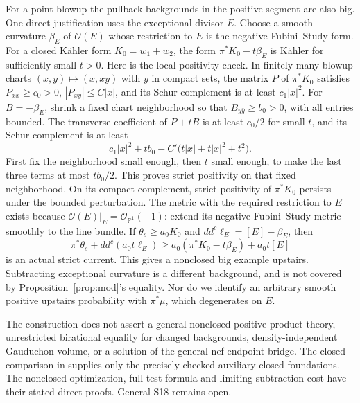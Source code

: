 \documentclass[11pt]{article}
\newcommand{\ddc}{dd^c}
\newcommand{\PP}{\mathbb P}
\begin{document}
For a point blowup the pullback backgrounds in the positive segment are
also big. One direct justification uses the exceptional divisor $E$.
Choose a smooth curvature $\beta_E$ of $\mathcal O(E)$ whose restriction
to $E$ is the negative Fubini--Study form. For a closed K\"ahler form
$K_0=w_1+w_2$, the form $\pi^*K_0-t\beta_E$ is K\"ahler for sufficiently
small $t>0$. Here is the local positivity check. In finitely many blowup
charts $(x,y)\mapsto(x,xy)$ with $y$ in compact sets, the matrix $P$ of
$\pi^*K_0$ satisfies $P_{x\bar x}\geq c_0>0$,
$|P_{x\bar y}|\leq C|x|$, and its Schur complement is at least
$c_1|x|^2$. For $B=-\beta_E$, shrink a fixed chart neighborhood so that
$B_{y\bar y}\geq b_0>0$, with all entries bounded. The transverse
coefficient of $P+tB$ is at least $c_0/2$ for small $t$, and its Schur
complement is at least
\[
 c_1|x|^2+t b_0-C'\bigl(t|x|+t|x|^2+t^2\bigr).
\]
First fix the neighborhood small enough, then $t$ small enough, to make
the last three terms at most $t b_0/2$. This proves strict positivity on
that fixed neighborhood. On its compact complement, strict positivity
of $\pi^*K_0$ persists under the bounded perturbation. The metric with
the required restriction to $E$ exists because
$\mathcal O(E)|_E=\mathcal O_{\PP^1}(-1)$: extend its negative
Fubini--Study metric smoothly to the line bundle. If $\theta_s\geq a_0K_0$ and
$\ddc\ell_E=[E]-\beta_E$, then
\[
 \pi^*\theta_s+\ddc(a_0t\ell_E)
   \geq a_0(\pi^*K_0-t\beta_E)+a_0t[E]
\]
is an actual strict current. This gives a nonclosed big example upstairs.
Subtracting exceptional curvature is a different background, and is not
covered by Proposition~\ref{prop:mod}'s equality. Nor do we identify an
arbitrary smooth positive upstairs probability with $\pi^*\mu$, which
degenerates on $E$.

The construction does not assert a general nonclosed positive-product
theory, unrestricted birational equality for changed backgrounds,
density-independent Gauduchon volume, or a solution of the general
nef-endpoint bridge. The closed comparison in \cite{BEGZ} supplies only
the precisely checked auxiliary closed foundations. The nonclosed
optimization, full-test formula and limiting subtraction cost have
their stated direct proofs. General S18 remains open.
\end{document}
